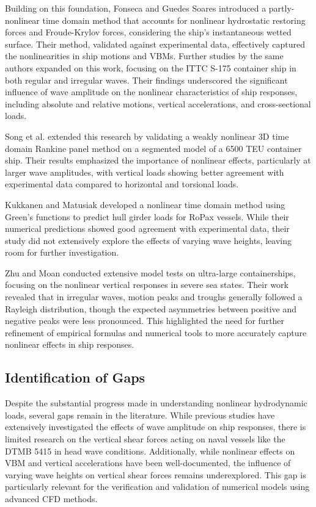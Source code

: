 \documentclass[12pt]{article} %
\begin{document}
Building on this foundation, Fonseca and Guedes Soares \cite{Fonseca2002} introduced a partly-nonlinear 
time domain method that accounts for nonlinear hydrostatic restoring forces and Froude-Krylov forces, 
considering the ship's instantaneous wetted surface. Their method, validated against experimental data, 
effectively captured the nonlinearities in ship motions and VBMs. Further studies by the same authors 
\cite{Fonseca2004a, Fonseca2004b} expanded on this work, focusing on the ITTC S-175 container ship 
in both regular and irregular waves. Their findings underscored the significant influence of wave 
amplitude on the nonlinear characteristics of ship responses, including absolute and relative motions, 
vertical accelerations, and cross-sectional loads.

Song et al. \cite{Song2011} extended this research by validating a weakly nonlinear 3D time domain 
Rankine panel method on a segmented model of a 6500 TEU container ship. Their results emphasized the 
importance of nonlinear effects, particularly at larger wave amplitudes, with vertical loads showing 
better agreement with experimental data compared to horizontal and torsional loads.

Kukkanen and Matusiak \cite{Kukkanen2014} developed a nonlinear time domain method using Green's 
functions to predict hull girder loads for RoPax vessels. While their numerical predictions showed 
good agreement with experimental data, their study did not extensively explore the effects of varying 
wave heights, leaving room for further investigation.

Zhu and Moan \cite{Zhu2013, Zhu2014} conducted extensive model tests on ultra-large containerships, 
focusing on the nonlinear vertical responses in severe sea states. Their work revealed that in irregular 
waves, motion peaks and troughs generally followed a Rayleigh distribution, though the expected 
asymmetries between positive and negative peaks were less pronounced. This highlighted the need for 
further refinement of empirical formulas and numerical tools to more accurately capture nonlinear 
effects in ship responses.

\subsection{Identification of Gaps}
Despite the substantial progress made in understanding nonlinear hydrodynamic loads, several gaps 
remain in the literature. While previous studies have extensively investigated the effects of wave 
amplitude on ship responses, there is limited research on the vertical shear forces acting on naval 
vessels like the DTMB 5415 in head wave conditions. Additionally, while nonlinear effects on VBM and 
vertical accelerations have been well-documented, the influence of varying wave heights on vertical 
shear forces remains underexplored. This gap is particularly relevant for the verification and validation 
of numerical models using advanced CFD methods.
\end{document}
